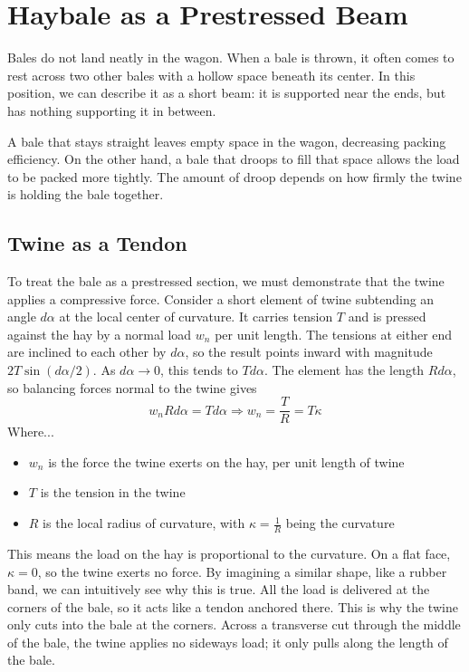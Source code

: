 \section{Haybale as a Prestressed Beam}
Bales do not land neatly in the wagon. When a bale is thrown, it often comes to rest across two other bales with a hollow space beneath its center. In this position, we can describe it as a short beam: it is supported near the ends, but has nothing supporting it in between. 

A bale that stays straight leaves empty space in the wagon, decreasing packing efficiency. On the other hand, a bale that droops to fill that space allows the load to be packed more tightly. The amount of droop depends on how firmly the twine is holding the bale together.

\subsection{Twine as a Tendon}
To treat the bale as a prestressed section, we must demonstrate that the twine applies a compressive force. Consider a short element of twine subtending an angle $d\alpha$ at the local center of curvature. It carries tension $T$ and is pressed against the hay by a normal load $w_n$ per unit length. The tensions at either end are inclined to each other by $d\alpha$, so the result points inward with magnitude $2T\sin(d\alpha/2)$. As $d\alpha\rightarrow0$, this tends to $Td\alpha$. The element has the length $Rd\alpha$, so balancing forces normal to the twine gives
\[
w_nRd\alpha=Td\alpha\Rightarrow w_n=\frac{T}{R}=T\kappa
\]
Where...
\begin{itemize}
	\item $w_n$ is the force the twine exerts on the hay, per unit length of twine
	\item $T$ is the tension in the twine
	\item $R$ is the local radius of curvature, with $\kappa=\frac{1}{R}$ being the curvature
\end{itemize}

This means the load on the hay is proportional to the curvature. On a flat face, $\kappa=0$, so the twine exerts no force. By imagining a similar shape, like a rubber band, we can intuitively see why this is true. All the load is delivered at the corners of the bale, so it acts like a tendon anchored there. This is why the twine only cuts into the bale at the corners. Across a transverse cut through the middle of the bale, the twine applies no sideways load; it only pulls along the length of the bale.

